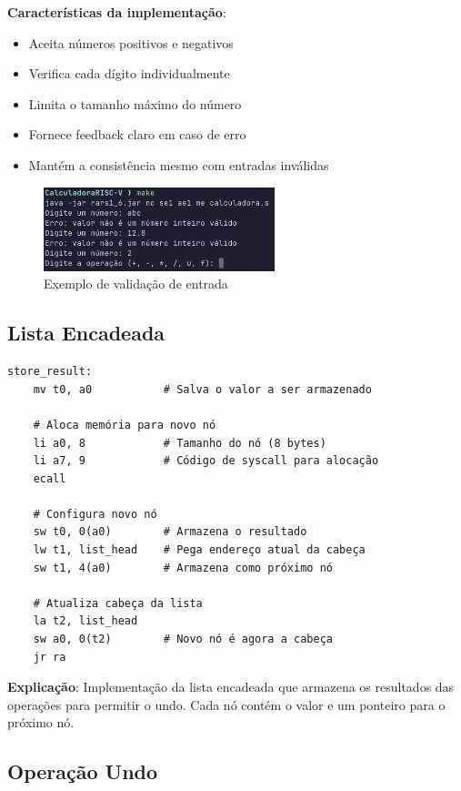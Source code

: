 \documentclass[12pt]{article}
\begin{document}
\textbf{Características da implementação}:

\begin{itemize}
	\item Aceita números positivos e negativos
	\item Verifica cada dígito individualmente
	\item Limita o tamanho máximo do número
	\item Fornece feedback claro em caso de erro
	\item Mantém a consistência mesmo com entradas inválidas
\end{itemize}

\begin{figure}[H]
	\centering
	\includegraphics[width=0.6\textwidth]{images/input_validation.png}
	\caption{Exemplo de validação de entrada}
\end{figure}

\subsection{Lista Encadeada}

\begin{lstlisting}[language={[x86masm]Assembler}, caption=Armazenamento de resultados]
store_result:
    mv t0, a0           # Salva o valor a ser armazenado

    # Aloca memória para novo nó
    li a0, 8            # Tamanho do nó (8 bytes)
    li a7, 9            # Código de syscall para alocação
    ecall

    # Configura novo nó
    sw t0, 0(a0)        # Armazena o resultado
    lw t1, list_head    # Pega endereço atual da cabeça
    sw t1, 4(a0)        # Armazena como próximo nó

    # Atualiza cabeça da lista
    la t2, list_head
    sw a0, 0(t2)        # Novo nó é agora a cabeça
    jr ra
\end{lstlisting}

\textbf{Explicação}: Implementação da lista encadeada que armazena os
resultados das operações para permitir o undo. Cada nó contém o valor
e um ponteiro para o próximo nó.

\subsection{Operação Undo}
\end{document}
